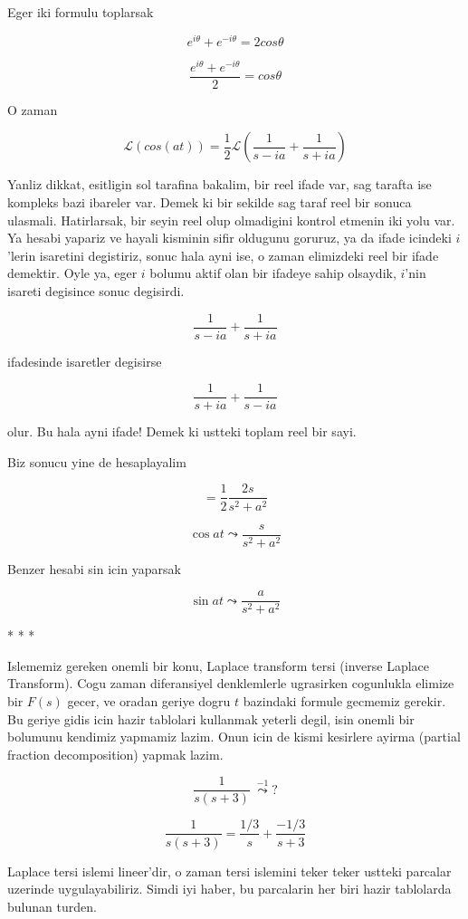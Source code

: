 \documentclass[12pt,fleqn]{article}\usepackage{../common}
\begin{document}
Eger iki formulu toplarsak

\[ e^{i\theta} + e^{-i\theta} = 2 cos\theta \]

\[ \frac{e^{i\theta} + e^{-i\theta}}{2} = cos\theta \]

O zaman 

\[ \mathcal{L}(cos(at)) = \frac{1}{2} \mathcal{L} 
(\frac{1}{s-ia} + \frac{1}{s+ia} )
\]

Yanliz dikkat, esitligin sol tarafina bakalim, bir reel ifade var, sag
tarafta ise kompleks bazi ibareler var. Demek ki bir sekilde sag taraf reel
bir sonuca ulasmali. Hatirlarsak, bir seyin reel olup olmadigini kontrol
etmenin iki yolu var. Ya hesabi yapariz ve hayali kisminin sifir oldugunu
goruruz, ya da ifade icindeki $i$'lerin isaretini degistiriz, sonuc hala
ayni ise, o zaman elimizdeki reel bir ifade demektir. Oyle ya, eger $i$
bolumu aktif olan bir ifadeye sahip olsaydik, $i$'nin isareti degisince
sonuc degisirdi. 

\[ \frac{1}{s-ia} + \frac{1}{s+ia} \]

ifadesinde isaretler degisirse 

\[ \frac{1}{s+ia} + \frac{1}{s-ia} \]

olur. Bu hala ayni ifade! Demek ki ustteki toplam reel bir sayi. 

Biz sonucu yine de hesaplayalim

\[ = \frac{1}{2}\frac{2s}{s^2+a^2} \]

\[ \cos at \leadsto \frac{s}{s^2+a^2} \]

Benzer hesabi sin icin yaparsak 

\[ \sin at \leadsto \frac{a}{s^2 + a^2} \]


* * * 

Islememiz gereken onemli bir konu, Laplace transform tersi (inverse Laplace
Transform). Cogu zaman diferansiyel denklemlerle ugrasirken cogunlukla
elimize bir $F(s)$ gecer, ve oradan geriye dogru $t$ bazindaki formule
gecmemiz gerekir. Bu geriye gidis icin hazir tablolari kullanmak yeterli
degil, isin onemli bir bolumunu kendimiz yapmamiz lazim. Onun icin de kismi
kesirlere ayirma (partial fraction decomposition) yapmak lazim.  

\[ \frac{1}{s(s+3)} \  \stackrel{-1}{\leadsto} ? \]


\[ \frac{1}{s(s+3)} = 
\frac{1/3}{s} + \frac{-1/3}{s+3}
\]

Laplace tersi islemi lineer'dir, o zaman tersi islemini teker teker ustteki
parcalar uzerinde uygulayabiliriz. Simdi iyi haber, bu parcalarin her biri
hazir tablolarda bulunan turden. 
\end{document}
